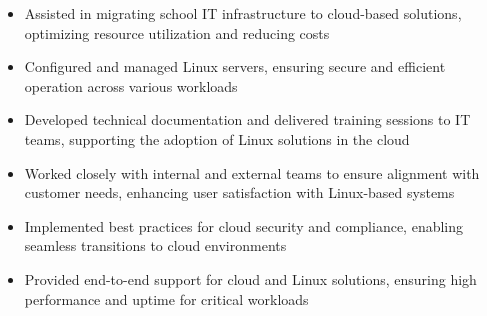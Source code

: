 \par\smallskip
\noindent
\begin{minipage}{20cm}
  \begin{minipage}{9.75cm}
    \begin{itemize}
      \item Assisted in migrating school IT infrastructure to cloud-based solutions, optimizing resource utilization and reducing costs
      \item Configured and managed Linux servers, ensuring secure and efficient operation across various workloads
      \item Developed technical documentation and delivered training sessions to IT teams, supporting the adoption of Linux solutions in the cloud
    \end{itemize}
  \end{minipage}
  \hfill
  \begin{minipage}{9.75cm}
    \begin{itemize}
      \item Worked closely with internal and external teams to ensure alignment with customer needs, enhancing user satisfaction with Linux-based systems
      \item Implemented best practices for cloud security and compliance, enabling seamless transitions to cloud environments
      \item Provided end-to-end support for cloud and Linux solutions, ensuring high performance and uptime for critical workloads
    \end{itemize}
  \end{minipage}
\end{minipage}
\par\smallskip
\divider

